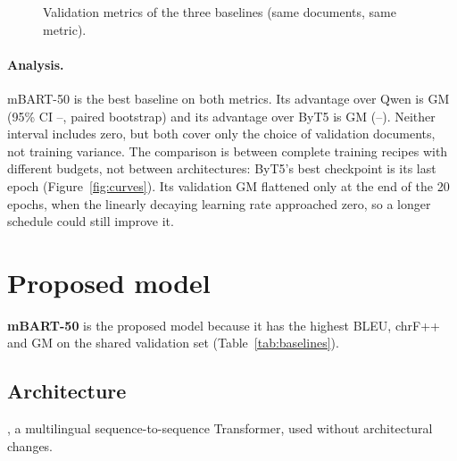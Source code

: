 \documentclass[a4paper,12pt]{article}
\begin{document}
\begin{figure}[H]
    \centering
    \caption{Validation metrics of the three baselines (same documents, same metric).}
    \label{fig:metrics}
\end{figure}

\paragraph{Analysis.}
mBART-50 is the best baseline on both metrics. Its advantage over Qwen is \DiffQw{} GM (95\% CI \DiffQwLO--\DiffQwHI, paired bootstrap) and its advantage over ByT5 is \DiffBt{} GM (\DiffBtLO--\DiffBtHI). Neither interval includes zero, but both cover only the choice of validation documents, not training variance. The comparison is between complete training recipes with different budgets, not between architectures: ByT5's best checkpoint is its last epoch (Figure~\ref{fig:curves}). Its validation GM flattened only at the end of the 20 epochs, when the linearly decaying learning rate approached zero, so a longer schedule could still improve it.

\section{Proposed model}
\label{sec:proposed}
\textbf{mBART-50} is the proposed model because it has the highest BLEU, chrF++ and GM on the shared validation set (Table~\ref{tab:baselines}).

\subsection{Architecture}
, a multilingual sequence-to-sequence Transformer, used without architectural changes.
\end{document}
